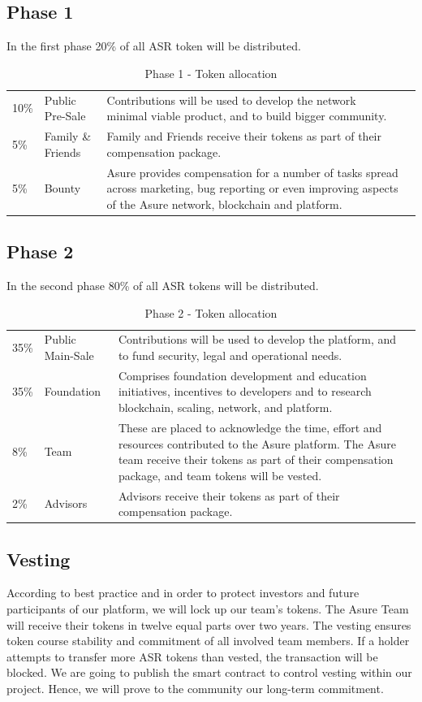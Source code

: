 \subsection{Phase 1}

In the first phase 20\% of all ASR token will be distributed.

\begin{table}[H]
\begin{tabular}{llp{}l}
  10\% & Public Pre-Sale & Contributions will be used to develop the network minimal viable product, and to build bigger community.\\
  5\% & Family \& Friends & Family and Friends receive their tokens as part of their compensation package.\\
  5\% & Bounty & Asure provides compensation for a number of tasks spread across marketing, bug reporting or even improving aspects of the Asure network, blockchain and platform.
\end{tabular}
\caption{\label{tab:table-name} Phase 1 - Token allocation}
\end{table}

\subsection{Phase 2}

In the second phase 80\% of all ASR tokens will be distributed.

\begin{table}[H]
\begin{tabular}{llp{}l}
  35\% & Public Main-Sale & Contributions will be used to develop the platform, and to fund security, legal and operational needs. \\
  35\% & Foundation & Comprises foundation development and education initiatives, incentives to developers and to research blockchain, scaling, network, and platform.\\
  8\% & Team  & These are placed to acknowledge the time, effort and resources contributed to the Asure platform.  The Asure team receive their tokens as part of their compensation package, and team tokens will be vested.\\
  2\% & Advisors & Advisors receive their tokens as part of their compensation package.
\end{tabular}
\caption{\label{tab:table-name} Phase 2 - Token allocation}
\end{table}

\subsection{Vesting}
According to best practice and in order to protect investors and future participants of our platform, we will lock up our team’s tokens. The Asure Team will receive their tokens in twelve equal parts over two years.
The vesting ensures token course stability and commitment of all involved team members. If a holder attempts to transfer more ASR tokens than vested, the transaction will be blocked.
We are going to publish the smart contract to control vesting within our project. Hence, we will prove to the community our long-term commitment.


